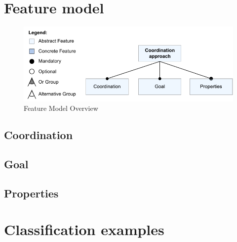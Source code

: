 \documentclass[runningheads]{llncs}
\begin{document}

\cite{gomesCoSimulationSurvey2019}

\cite{varalarsenBCOolBehavioralCoordination2016,varalarsenBehavioralCoordinationOperator2015}~\cite{krauterBehavioralConsistencyMultimodeling2023}


\section{Feature model} \label{sec:features}

\begin{figure}[ht]
	\centering
	\includegraphics[width=1\textwidth]{images/root}
	\caption{Feature Model Overview}
	\label{fig:feature_model_root}
\end{figure}

\subsection{Coordination}
\subsection{Goal}
\subsection{Properties}

\section{Classification examples} \label{sec:classifications}
\end{document}
